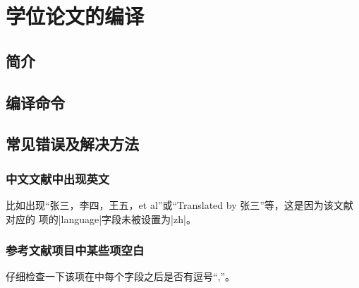 
\chapter{学位论文的编译}

\section{简介}

\section{编译命令}

\section{常见错误及解决方法}

\subsection{中文文献中出现英文}

比如出现``张三，李四，王五，et al''或``Translated by 张三''等，这是因为该文献对应的
{\BibTeX}项的|language|字段未被设置为|zh|。

\subsection{参考文献项目中某些项空白}

仔细检查一下该项在{\BibTeX}中每个字段之后是否有逗号``,''。
